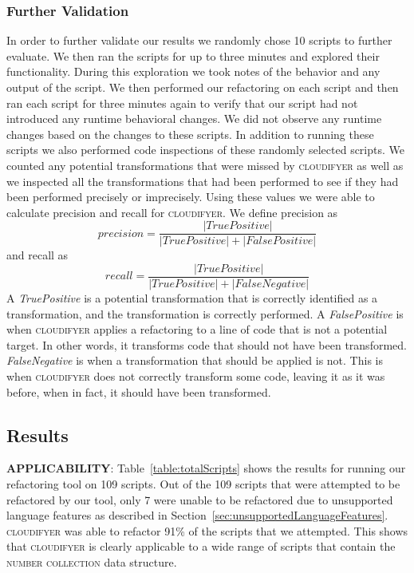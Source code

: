 \documentclass{sigplanconf}
\begin{document}
\subsubsection{Further Validation}
In order to further validate our results we randomly chose 10 scripts to further evaluate.  We then ran the scripts for up to three minutes and explored their functionality.  During this exploration we took notes of the behavior and any output of the script.  We then performed our refactoring on each script and then ran each script for three minutes again to verify that our script had not introduced any runtime behavioral changes. We did not observe any runtime changes based on the changes to these scripts.
In addition to running these scripts we also performed code inspections of these randomly selected scripts.  We counted any potential transformations that were missed by \textsc{cloudifyer} as well as we inspected all the transformations that had been performed to see if they had been performed precisely or imprecisely.  Using these values we were able to calculate precision and recall for \textsc{cloudifyer}.  We define precision as
\[precision = \frac{|True Positive|}{|True Positive|+|False Positive|}\]
and recall as
\[recall = \frac{|True Positive|}{|True Positive|+|False Negative|}\]
A {\it TruePositive} is a potential transformation that is correctly identified as a transformation, and the transformation is correctly performed.  A {\it FalsePositive} is when \textsc{cloudifyer} applies a refactoring to a line of code that is not a potential target.  In other words, it transforms code that should not have been transformed.   {\it FalseNegative} is when a transformation that should be applied is not.  This is when \textsc{cloudifyer} does not correctly transform some code, leaving it as it was before, when in fact, it should have been transformed. 
\subsection{Results}

\textbf{APPLICABILITY}:  Table~\ref{table:totalScripts} shows the results for running our refactoring tool on 109 scripts.  Out of the 109 scripts that were attempted to be refactored by our tool, only 7 were unable to be refactored due to unsupported language features as described in Section~\ref{sec:unsupportedLanguageFeatures}.  \textsc{cloudifyer} was able to refactor 91\% of the scripts that we attempted.  This shows that \textsc{cloudifyer} is clearly applicable to a wide range of scripts that contain the \textsc{number collection} data structure.
\end{document}
